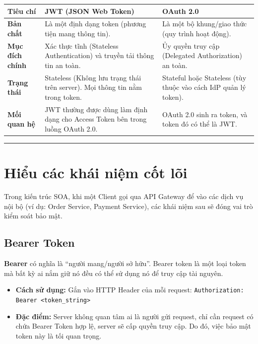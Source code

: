 \documentclass[12pt,a4paper]{article}
\begin{document}
\begin{table}[h]
\centering
\renewcommand{\arraystretch}{1.5}
\begin{tabular}{|p{3cm}|p{6cm}|p{6cm}|}
\hline
\textbf{Tiêu chí} & \textbf{JWT (JSON Web Token)} & \textbf{OAuth 2.0} \\ 
\hline
\textbf{Bản chất} & Là một định dạng token (phương tiện mang thông tin). & Là một bộ khung/giao thức (quy trình hoạt động). \\ 
\hline
\textbf{Mục đích chính} & Xác thực tĩnh (Stateless Authentication) và truyền tải thông tin an toàn. & Ủy quyền truy cập (Delegated Authorization) an toàn. \\ 
\hline
\textbf{Trạng thái} & Stateless (Không lưu trạng thái trên server). Mọi thông tin nằm trong token. & Stateful hoặc Stateless (tùy thuộc vào cách IdP quản lý token). \\ 
\hline
\textbf{Mối quan hệ} & JWT thường được dùng làm định dạng cho Access Token bên trong luồng OAuth 2.0. & OAuth 2.0 sinh ra token, và token đó có thể là JWT. \\ 
\hline
\end{tabular}
\end{table}

\vspace{0.5cm}
\hrule
\vspace{0.5cm}

\section{Hiểu các khái niệm cốt lõi}

Trong kiến trúc SOA, khi một Client gọi qua API Gateway để vào các dịch vụ nội bộ (ví dụ: Order Service, Payment Service), các khái niệm sau sẽ đóng vai trò kiểm soát bảo mật.

\subsection{Bearer Token}
\textbf{Bearer} có nghĩa là ``người mang/người sở hữu''. Bearer token là một loại token mà bất kỳ ai nắm giữ nó đều có thể sử dụng nó để truy cập tài nguyên.
\begin{itemize}
    \item \textbf{Cách sử dụng:} Gắn vào HTTP Header của mỗi request: \texttt{Authorization: Bearer <token\_string>}
    \item \textbf{Đặc điểm:} Server không quan tâm ai là người gửi request, chỉ cần request có chứa Bearer Token hợp lệ, server sẽ cấp quyền truy cập. Do đó, việc bảo mật token này là tối quan trọng.
\end{itemize}
\end{document}
